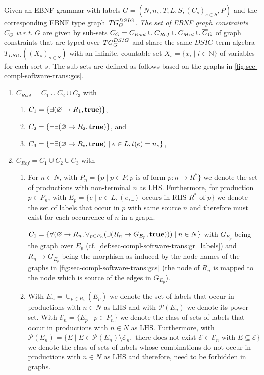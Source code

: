 \begin{definition}
\label{def:sec-compl-software-trans:ebnf_constraints}
Given an EBNF grammar with labels $G=(N,n_s,T,L,S,(C_s)_{s \in S},P)$ and the corresponding EBNF type graph $\mathit{TG}_G^{DSIG}$.
\emph{The set of EBNF graph constraints $C_G$ w.r.t. $G$} are given by sub-sets $C_G=C_{Root} \cup C_{Ref} \cup C_{Mul} \cup \overline{C}_G$ of graph constraints that are typed over $\mathit{TG}_G^{DSIG}$ and share the same $DSIG$-term-algebra $T_{DSIG}((X_s)_{s \in S})$ with an infinite, countable set $X_s=\{x_i\mid i \in \mathbb{N}\}$ of variables for each sort $s$.
The sub-sets are defined as follows based on the graphs in \cref{fig:sec-compl-software-trans:gcs}.
\begin{enumerate}
  \item $C_{Root}=C_1 \cup C_2 \cup C_3$ with
  \begin{enumerate}
    \item $C_1=\{\exists(\varnothing \to R_1, \textbf{true})\}$,
    \item $C_2=\{\neg\exists(\varnothing \to R_2, \textbf{true})\}$, and
    \item $C_3=\{\neg\exists(\varnothing \to R_e, \textbf{true}) \mid e \in L,t(e)=n_s\}$,
  \end{enumerate}
  \item \label{item:sec-compl-software-trans:ebnf_constraints2}
  $C_{Ref}=C_1 \cup C_2 \cup C_3$ with
  \begin{enumerate}
    \item For $n \in N$, with $P_n=\{p \mid p \in P,p \text{ is of form }p\colon n \to R^*\}$ we denote the set of productions with non-terminal $n$ as LHS.
  	Furthermore, for production $p \in P_n$, with $E_p=\{e \mid e \in L, (e,\_) \text{ occurs in RHS }R^*\text{ of }p\}$ we denote the set of labels that occur in $p$ with same source $n$ and therefore must exist for each occurrence of $n$ in a graph.
  
  	$C_1=\{\forall(\varnothing \to R_n,\vee_{p \in P_n}(\exists(R_n \to G_{E_p},\textbf{true}))) \mid n \in N\}$ with $G_{E_p}$ being the graph over $E_p$ (cf. \cref{def:sec-compl-software-trans:gr_labels}) and $R_n \to G_{E_p}$ being the morphism as induced by the node names of the graphs in \cref{fig:sec-compl-software-trans:gcs} (the node of $R_n$ is mapped to the node which is source of the edges in $G_{E_p}$).
    \item \label{item:sec-compl-software-trans:ebnf_constraints2b}With $E_n=\cup_{p \in P_n}(E_p)$ we denote the set of labels that occur in productions with $n \in N$ as LHS and with $\mathcal{P}(E_n)$ we denote its power set.
	With $\mathcal{E}_n=\{E_p \mid p \in P_n\}$ we denote the class of sets of labels that occur in productions with $n \in N$ as LHS.
  	Furthermore, with $\underline{\mathcal{P}}(E_n)=\{E \mid E \in \mathcal{P}(E_n) \setminus \mathcal{E}_n,\text{ there does not exist } \mathcal{E} \in \mathcal{E}_n \text{ with } E \subseteq \mathcal{E}\}$ we denote the class of sets of labels whose combinations do not occur in productions with $n \in N$ as LHS and therefore, need to be forbidden in graphs.
  

\end{enumerate}
\end{enumerate}
\end{definition}
